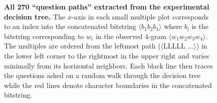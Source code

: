 \documentclass[12pt]{article}
\begin{document}
\begin{figure}
  \centering
  \vspace{-1in}
  \caption{\textbf{All 270 ``question paths'' extracted from the
      experimental decision tree.} The $x$-axis in each small multiple
    plot corresponds to an index into the concatenated bitstring
    $\langle b_1 b_2 b_3 \rangle$ where $b_i$ is the bitstring
    corresponding to $w_i$ in the observed 4-gram $\langle w_1 w_2 w_3
    w_4 \rangle$. The multiples are ordered from the leftmost path
    ($\langle$LLLLL $...\rangle$) in the lower left corner to the
    rightmost in the upper right and varies minimally from its
    horizontal neighbors. Each black line then traces the questions
    asked on a random walk through the decision tree while the red
    lines denote character boundaries in the concatenated bitstring.}
  \label{fig:bs_examplepaths}
\end{figure}
\end{document}
